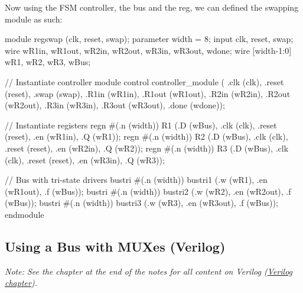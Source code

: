 \documentclass[12pt,openany]{book}
\begin{document}
\begin{minipage}[htp]{1\textwidth}
	Now using the FSM controller, the bus and the reg, we can defined the swapping module as such:
	\begin{vhdl}
	module regswap (clk, reset, swap);
		parameter width = 8;
		input clk, reset, swap;
		wire wR1in, wR1out, wR2in, wR2out, wR3in, wR3out, wdone;
		wire [width-1:0] wR1, wR2, wR3, wBus;
	
		// Instantiate controller module
		control controller_module ( .clk (clk), .reset (reset), .swap (swap),
		.R1in (wR1in), .R1out (wR1out), .R2in (wR2in), .R2out (wR2out),
		.R3in (wR3in), .R3out (wR3out), .done (wdone));
	
		// Instantiate registers
		regn #(.n (width)) R1 (.D (wBus), .clk (clk), .reset (reset), .en (wR1in), .Q (wR1));
		regn #(.n (width)) R2 (.D (wBus), .clk (clk), .reset (reset), .en (wR2in), .Q (wR2));
		regn #(.n (width)) R3 (.D (wBus), .clk (clk), .reset (reset), .en (wR3in), .Q (wR3));
	
		// Bus with tri-state drivers
		bustri #(.n (width)) bustri1 (.w (wR1), .en (wR1out), .f (wBus));
		bustri #(.n (width)) bustri2 (.w (wR2), .en (wR2out), .f (wBus));
		bustri #(.n (width)) bustri3 (.w (wR3), .en (wR3out), .f (wBus));
	endmodule
	\end{vhdl}
\end{minipage}

\subsection{Using a Bus with MUXes (Verilog)}
 \textit{Note: See the chapter at the end of the notes for all content on Verilog (\hyperref[Verilog]{Verilog chapter}).}
\end{document}
